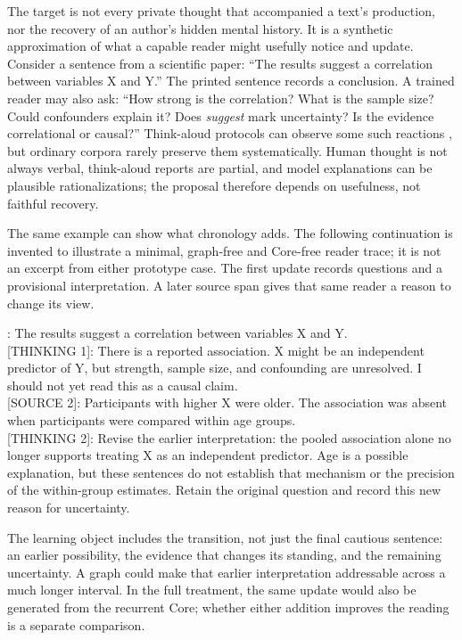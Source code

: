 \documentclass[11pt]{article}
\begin{document}
The target is not every private thought that accompanied a text's production,
nor the recovery of an author's hidden mental history. It is a synthetic
approximation of what a capable reader might usefully notice and update. Consider
a sentence from a scientific paper: ``The results suggest a correlation between
variables X and Y.'' The printed sentence records a conclusion. A trained reader
may also ask: ``How strong is the correlation? What is the sample size? Could
confounders explain it? Does \emph{suggest} mark uncertainty? Is the evidence
correlational or causal?'' Think-aloud protocols can observe some such reactions
\cite{ericsson1984protocol}, but ordinary corpora rarely preserve them
systematically. Human thought is not always verbal, think-aloud reports are
partial, and model explanations can be plausible rationalizations; the proposal
therefore depends on usefulness, not faithful recovery.

The same example can show what chronology adds. The following continuation is
invented to illustrate a minimal, graph-free and Core-free reader trace; it is
not an excerpt from either prototype case. The first update records questions
and a provisional interpretation. A later source span gives that same reader a
reason to change its view.

\begin{compactmetabox}
[SOURCE 1]: The results suggest a correlation between variables X and Y.\\[0.35em]
[THINKING 1]: There is a reported association. X might be an independent predictor of Y, but strength, sample size, and confounding are unresolved. I should not yet read this as a causal claim.\\[0.55em]
[SOURCE 2]: Participants with higher X were older. The association was absent when participants were compared within age groups.\\[0.35em]
[THINKING 2]: Revise the earlier interpretation: the pooled association alone no longer supports treating X as an independent predictor. Age is a possible explanation, but these sentences do not establish that mechanism or the precision of the within-group estimates. Retain the original question and record this new reason for uncertainty.
\end{compactmetabox}

The learning object includes the transition, not just the final cautious
sentence: an earlier possibility, the evidence that changes its standing, and
the remaining uncertainty. A graph could make that earlier interpretation
addressable across a much longer interval. In the full treatment, the same
update would also be generated from the recurrent Core; whether either addition
improves the reading is a separate comparison.
\end{document}
